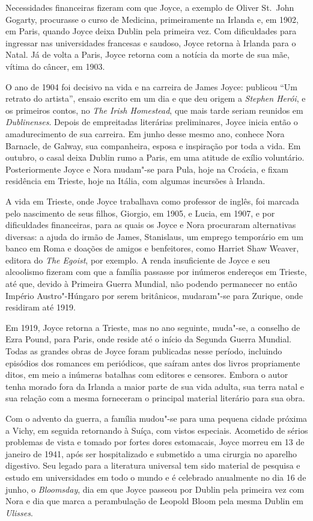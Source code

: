Necessidades financeiras fizeram com que Joyce, a exemplo de Oliver 
St.~John Gogarty, procurasse o curso de Medicina, primeiramente na Irlanda
e, em 1902, em Paris, quando Joyce deixa Dublin pela primeira vez. Com
dificuldades para ingressar nas universidades francesas e saudoso,
Joyce retorna à Irlanda para o Natal. Já de volta a Paris, Joyce
retorna com a notícia da morte de sua mãe, vítima do câncer, em 1903. 

O ano de 1904 foi decisivo na vida e na carreira de James Joyce: 
publicou “Um retrato do artista”, ensaio escrito em um
dia e que deu origem a \textit{Stephen Herói}, e os primeiros
contos, no \textit{The Irish Homestead}, que mais tarde seriam reunidos em \textit{Dublinenses}.
Depois de empreitadas literárias preliminares, Joyce inicia então o
amadurecimento de sua carreira. Em junho desse mesmo ano, conhece Nora
Barnacle, de Galway, sua companheira, esposa e inspiração por toda a
vida. Em outubro, o casal deixa Dublin rumo a Paris, em uma atitude de
exílio voluntário. Posteriormente Joyce e Nora mudam"-se para Pula, hoje
na Croácia, e fixam residência em Trieste, hoje na Itália, com algumas
incursões à Irlanda.  

A vida em Trieste, onde Joyce trabalhava como professor de inglês, foi
marcada pelo nascimento de seus filhos, Giorgio, em 1905, e Lucia, em
1907, e por dificuldades financeiras, para as quais os Joyce e Nora
procuraram alternativas diversas: a ajuda do irmão de James,
Stanislaus, um emprego temporário em um banco em Roma e doações de
amigos e benfeitores, como Harriet Shaw Weaver, editora do \textit{The
Egoist}, por exemplo. A renda insuficiente de Joyce e seu alcoolismo
fizeram com que a família passasse por inúmeros endereços em Trieste,
até que, devido à Primeira Guerra Mundial, não podendo permanecer no
então Império Austro"-Húngaro por serem britânicos, mudaram"-se para
Zurique, onde residiram até 1919. 

Em 1919, Joyce retorna a Trieste, mas no ano seguinte, muda"-se, a
conselho de Ezra Pound, para Paris, onde reside até o início da Segunda
Guerra Mundial. Todas as grandes obras de Joyce foram publicadas nesse
período, incluindo episódios dos romances em periódicos, que saíram
antes dos livros propriamente ditos, em meio a inúmeras batalhas com
editores e censores. Embora o autor tenha morado fora da Irlanda a
maior parte de sua vida adulta, sua terra natal e sua relação com a
mesma forneceram o principal material literário para sua obra. 

Com o advento da guerra, a família mudou"-se para uma pequena cidade
próxima a Vichy, em seguida retornando à Suíça, com vistos especiais.
Acometido de sérios problemas de vista e tomado por fortes dores
estomacais, Joyce morreu em 13 de janeiro de 1941, após ser
hospitalizado e submetido a uma cirurgia no aparelho digestivo. Seu
legado para a literatura universal tem sido material de pesquisa e
estudo em universidades em todo o mundo e é celebrado anualmente no dia
16 de junho, o \textit{Bloomsday}, dia em que Joyce passeou por Dublin
pela primeira vez com Nora e dia que marca a perambulação de Leopold
Bloom pela mesma Dublin em \textit{Ulisses}.

